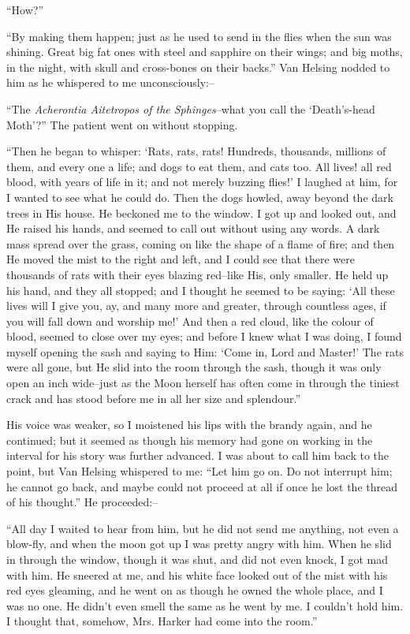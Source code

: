 \documentclass[12pt,openright]{book}
\begin{document}
“How?”

“By making them happen; just as he used to send in the flies when the sun was shining. Great big fat ones with steel and sapphire on their wings; and big moths, in the night, with skull and cross-bones on their backs.” Van Helsing nodded to him as he whispered to me unconsciously:–

“The \textit{Acherontia Aitetropos of the Sphinges}–what you call the ‘Death’s-head Moth’?” The patient went on without stopping.

“Then he began to whisper: ‘Rats, rats, rats! Hundreds, thousands, millions of them, and every one a life; and dogs to eat them, and cats too. All lives! all red blood, with years of life in it; and not merely buzzing flies!’ I laughed at him, for I wanted to see what he could do. Then the dogs howled, away beyond the dark trees in His house. He beckoned me to the window. I got up and looked out, and He raised his hands, and seemed to call out without using any words. A dark mass spread over the grass, coming on like the shape of a flame of fire; and then He moved the mist to the right and left, and I could see that there were thousands of rats with their eyes blazing red–like His, only smaller. He held up his hand, and they all stopped; and I thought he seemed to be saying: ‘All these lives will I give you, ay, and many more and greater, through countless ages, if you will fall down and worship me!’ And then a red cloud, like the colour of blood, seemed to close over my eyes; and before I knew what I was doing, I found myself opening the sash and saying to Him: ‘Come in, Lord and Master!’ The rats were all gone, but He slid into the room through the sash, though it was only open an inch wide–just as the Moon herself has often come in through the tiniest crack and has stood before me in all her size and splendour.”

His voice was weaker, so I moistened his lips with the brandy again, and he continued; but it seemed as though his memory had gone on working in the interval for his story was further advanced. I was about to call him back to the point, but Van Helsing whispered to me: “Let him go on. Do not interrupt him; he cannot go back, and maybe could not proceed at all if once he lost the thread of his thought.” He proceeded:–

“All day I waited to hear from him, but he did not send me anything, not even a blow-fly, and when the moon got up I was pretty angry with him. When he slid in through the window, though it was shut, and did not even knock, I got mad with him. He sneered at me, and his white face looked out of the mist with his red eyes gleaming, and he went on as though he owned the whole place, and I was no one. He didn’t even smell the same as he went by me. I couldn’t hold him. I thought that, somehow, Mrs. Harker had come into the room.”
\end{document}
